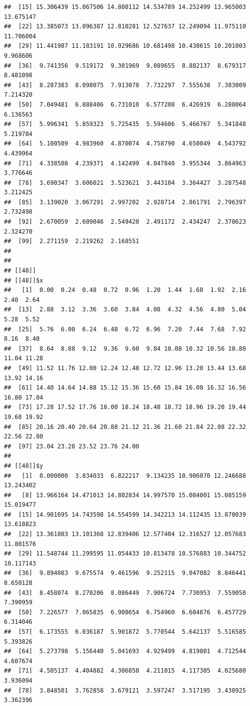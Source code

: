 \documentclass[
  ignorenonframetext,
]{beamer}
\begin{document}
\begin{frame}[fragile]{}
\begin{verbatim}
##  [15] 15.306439 15.067506 14.808112 14.534789 14.252499 13.965003 13.675147
##  [22] 13.385073 13.096387 12.810281 12.527637 12.249094 11.975110 11.706004
##  [29] 11.441987 11.183191 10.929686 10.681498 10.438615 10.201003  9.968606
##  [36]  9.741356  9.519172  9.301969  9.089655  8.882137  8.679317  8.481098
##  [43]  8.287383  8.098075  7.913078  7.732297  7.555638  7.383009  7.214320
##  [50]  7.049481  6.888406  6.731010  6.577208  6.426919  6.280064  6.136563
##  [57]  5.996341  5.859323  5.725435  5.594606  5.466767  5.341848  5.219784
##  [64]  5.100509  4.983960  4.870074  4.758790  4.650049  4.543792  4.439964
##  [71]  4.338508  4.239371  4.142499  4.047840  3.955344  3.864963  3.776646
##  [78]  3.690347  3.606021  3.523621  3.443104  3.364427  3.287548  3.212425
##  [85]  3.139020  3.067291  2.997202  2.928714  2.861791  2.796397  2.732498
##  [92]  2.670059  2.609046  2.549428  2.491172  2.434247  2.378623  2.324270
##  [99]  2.271159  2.219262  2.168551
## 
## 
## [[48]]
## [[48]]$x
##   [1]  0.00  0.24  0.48  0.72  0.96  1.20  1.44  1.68  1.92  2.16  2.40  2.64
##  [13]  2.88  3.12  3.36  3.60  3.84  4.08  4.32  4.56  4.80  5.04  5.28  5.52
##  [25]  5.76  6.00  6.24  6.48  6.72  6.96  7.20  7.44  7.68  7.92  8.16  8.40
##  [37]  8.64  8.88  9.12  9.36  9.60  9.84 10.08 10.32 10.56 10.80 11.04 11.28
##  [49] 11.52 11.76 12.00 12.24 12.48 12.72 12.96 13.20 13.44 13.68 13.92 14.16
##  [61] 14.40 14.64 14.88 15.12 15.36 15.60 15.84 16.08 16.32 16.56 16.80 17.04
##  [73] 17.28 17.52 17.76 18.00 18.24 18.48 18.72 18.96 19.20 19.44 19.68 19.92
##  [85] 20.16 20.40 20.64 20.88 21.12 21.36 21.60 21.84 22.08 22.32 22.56 22.80
##  [97] 23.04 23.28 23.52 23.76 24.00
## 
## [[48]]$y
##   [1]  0.000000  3.834033  6.822217  9.134235 10.906070 12.246688 13.243402
##   [8] 13.966164 14.471013 14.802834 14.997570 15.084001 15.085159 15.019477
##  [15] 14.901695 14.743598 14.554599 14.342213 14.112435 13.870039 13.618823
##  [22] 13.361803 13.101368 12.839406 12.577404 12.316527 12.057683 11.801576
##  [29] 11.548744 11.299595 11.054433 10.813478 10.576883 10.344752 10.117143
##  [36]  9.894083  9.675574  9.461596  9.252115  9.047082  8.846441  8.650128
##  [43]  8.458074  8.270206  8.086449  7.906724  7.730953  7.559058  7.390959
##  [50]  7.226577  7.065835  6.908654  6.754960  6.604676  6.457729  6.314046
##  [57]  6.173555  6.036187  5.901872  5.770544  5.642137  5.516585  5.393826
##  [64]  5.273798  5.156440  5.041693  4.929499  4.819801  4.712544  4.607674
##  [71]  4.505137  4.404882  4.306858  4.211015  4.117305  4.025680  3.936094
##  [78]  3.848501  3.762858  3.679121  3.597247  3.517195  3.438925  3.362396

\end{verbatim}
\end{frame}
\end{document}
